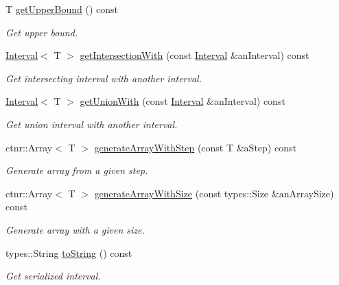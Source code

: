\begin{DoxyCompactItemize}
T \hyperlink{classlibrary_1_1math_1_1obj_1_1_interval_a97d09e9c5e7f67b6ddf162af01a8066e}{get\+Upper\+Bound} () const
\begin{DoxyCompactList}\small\item\em Get upper bound. \end{DoxyCompactList}\item 
\hyperlink{classlibrary_1_1math_1_1obj_1_1_interval}{Interval}$<$ T $>$ \hyperlink{classlibrary_1_1math_1_1obj_1_1_interval_a2f23ca14d71c454417270218132423de}{get\+Intersection\+With} (const \hyperlink{classlibrary_1_1math_1_1obj_1_1_interval}{Interval} \&an\+Interval) const
\begin{DoxyCompactList}\small\item\em Get intersecting interval with another interval. \end{DoxyCompactList}\item 
\hyperlink{classlibrary_1_1math_1_1obj_1_1_interval}{Interval}$<$ T $>$ \hyperlink{classlibrary_1_1math_1_1obj_1_1_interval_a4183db388b6a63429a031d3687b20ecf}{get\+Union\+With} (const \hyperlink{classlibrary_1_1math_1_1obj_1_1_interval}{Interval} \&an\+Interval) const
\begin{DoxyCompactList}\small\item\em Get union interval with another interval. \end{DoxyCompactList}\item 
ctnr\+::\+Array$<$ T $>$ \hyperlink{classlibrary_1_1math_1_1obj_1_1_interval_aef3fddb9522a6e976499436e156bfe1d}{generate\+Array\+With\+Step} (const T \&a\+Step) const
\begin{DoxyCompactList}\small\item\em Generate array from a given step. \end{DoxyCompactList}\item 
ctnr\+::\+Array$<$ T $>$ \hyperlink{classlibrary_1_1math_1_1obj_1_1_interval_a250e05a1f463f107952b437e5ff4f4d2}{generate\+Array\+With\+Size} (const types\+::\+Size \&an\+Array\+Size) const
\begin{DoxyCompactList}\small\item\em Generate array with a given size. \end{DoxyCompactList}\item 
types\+::\+String \hyperlink{classlibrary_1_1math_1_1obj_1_1_interval_ad75c400daf533c35bc91da8c50b00a9e}{to\+String} () const
\begin{DoxyCompactList}\small\item\em Get serialized interval. \end{DoxyCompactList}\item 

\end{DoxyCompactItemize}
